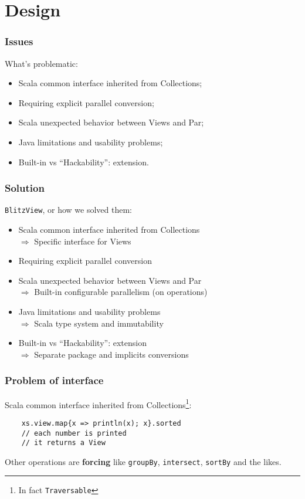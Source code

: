 \documentclass[12pt]{beamer}
\begin{document}
\section{Design}
\begin{frame}
    \frametitle{Issues}
    What's problematic:
    \begin{itemize}
        \item Scala common interface inherited from Collections;
        \item Requiring explicit parallel conversion;
        \item Scala unexpected behavior between Views and Par;
        \item Java limitations and usability problems;
        \item Built-in vs ``Hackability'': extension.
    \end{itemize}
\end{frame}

\begin{frame}
    \frametitle{Solution}
    {\tt BlitzView}, or how we solved them:
    \begin{itemize}
        \item Scala common interface inherited from Collections \\
            $\Rightarrow$ Specific interface for Views
        \item Requiring explicit parallel conversion \\
        \item Scala unexpected behavior between Views and Par \\
            $\Rightarrow$ Built-in configurable parallelism (on operations)
        \item Java limitations and usability problems \\
            $\Rightarrow$ Scala type system and immutability
        \item Built-in vs ``Hackability'': extension \\
            $\Rightarrow$ Separate package and implicits conversions
    \end{itemize}
\end{frame}

\begin{frame}[fragile]
    \frametitle{Problem of interface}
    Scala common interface inherited from Collections\footnote{In fact {\tt Traversable}}:
    \begin{lstlisting}
    xs.view.map{x => println(x); x}.sorted
    // each number is printed
    // it returns a View
    \end{lstlisting}
    Other operations are {\bf forcing} like \verb|groupBy|, \verb|intersect|, \verb|sortBy| and the likes.
\end{frame}
\end{document}
